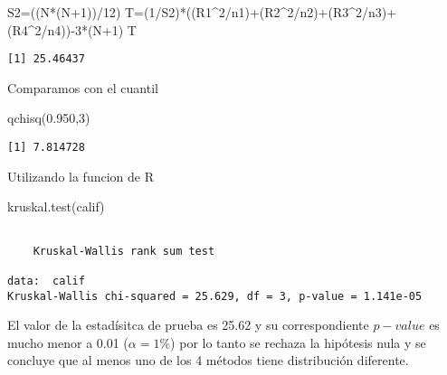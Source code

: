 \documentclass[
  a4paper,
  oneside,
  openany]{book}
\newenvironment{Shaded}{\begin{snugshade}}{\end{snugshade}}
\newcommand{\DecValTok}[1]{\textcolor[rgb]{0.00,0.00,0.81}{#1}}
\newcommand{\FloatTok}[1]{\textcolor[rgb]{0.00,0.00,0.81}{#1}}
\newcommand{\FunctionTok}[1]{\textcolor[rgb]{0.00,0.00,0.00}{#1}}
\newcommand{\NormalTok}[1]{#1}
\newcommand{\OtherTok}[1]{\textcolor[rgb]{0.56,0.35,0.01}{#1}}
\newcommand{\SpecialCharTok}[1]{\textcolor[rgb]{0.00,0.00,0.00}{#1}}
\begin{document}
\begin{Shaded}
\begin{Highlighting}[]
\NormalTok{S2}\OtherTok{=}\NormalTok{((N}\SpecialCharTok{*}\NormalTok{(N}\SpecialCharTok{+}\DecValTok{1}\NormalTok{))}\SpecialCharTok{/}\DecValTok{12}\NormalTok{)}
\NormalTok{T}\OtherTok{=}\NormalTok{(}\DecValTok{1}\SpecialCharTok{/}\NormalTok{S2)}\SpecialCharTok{*}\NormalTok{((R1}\SpecialCharTok{\^{}}\DecValTok{2}\SpecialCharTok{/}\NormalTok{n1)}\SpecialCharTok{+}\NormalTok{(R2}\SpecialCharTok{\^{}}\DecValTok{2}\SpecialCharTok{/}\NormalTok{n2)}\SpecialCharTok{+}\NormalTok{(R3}\SpecialCharTok{\^{}}\DecValTok{2}\SpecialCharTok{/}\NormalTok{n3)}\SpecialCharTok{+}\NormalTok{(R4}\SpecialCharTok{\^{}}\DecValTok{2}\SpecialCharTok{/}\NormalTok{n4))}\SpecialCharTok{{-}}\DecValTok{3}\SpecialCharTok{*}\NormalTok{(N}\SpecialCharTok{+}\DecValTok{1}\NormalTok{)}
\NormalTok{T}
\end{Highlighting}
\end{Shaded}

\begin{verbatim}
[1] 25.46437
\end{verbatim}

Comparamos con el cuantil

\begin{Shaded}
\begin{Highlighting}[]
\FunctionTok{qchisq}\NormalTok{(}\FloatTok{0.950}\NormalTok{,}\DecValTok{3}\NormalTok{)}
\end{Highlighting}
\end{Shaded}

\begin{verbatim}
[1] 7.814728
\end{verbatim}

Utilizando la funcion de R

\begin{Shaded}
\begin{Highlighting}[]
\FunctionTok{kruskal.test}\NormalTok{(calif)}
\end{Highlighting}
\end{Shaded}

\begin{verbatim}

    Kruskal-Wallis rank sum test

data:  calif
Kruskal-Wallis chi-squared = 25.629, df = 3, p-value = 1.141e-05
\end{verbatim}

El valor de la estadísitca de prueba es 25.62 y su correspondiente \(p-value\) es mucho menor a 0.01 (\(\alpha=1\%\)) por lo tanto se rechaza la hipótesis nula y se concluye que al menos uno de los 4 métodos tiene distribución diferente.
\end{document}
